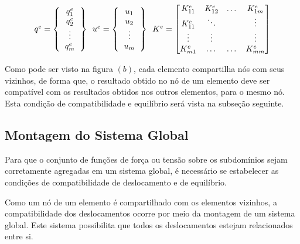 \documentclass[
    12pt,               %
    openright,          %
    oneside,
    a4paper,            %
    english,            %
    french,             %
    spanish,            %
    brazil              %
    ]{abntex2}
\begin{document}
  \begin{equation}
     \label{eq:assembly}
     \begin{tabular}{c c c}
     $q^e = 
         \left \{
         \begin{tabular}{c}
             $q^e_1$ \\
             $q^e_2$ \\
             \vdots \\
             $q^e_m$
         \end{tabular}       
         \right \}$
         \
     $u^e = 
         \left \{
         \begin{tabular}{c}
             $u_1$ \\
             $u_2$ \\
             \vdots \\
             $u_m$
         \end{tabular}       
         \right \}   $
         \
         $K^e =
         \begin{bmatrix}
             K^e_{11}    & K^e_{12}  & \dots     & K^e_{1m} \\
             K^e_{11}    & \ddots  & \   & \vdots \\
             \vdots  & \vdots     & \    & \vdots \\
             K^e_{m1}    & \dots   & \dots   & K^e_{mm} 
         \end{bmatrix}    $      
     \end{tabular} 
  \end{equation}
  
  
Como pode ser visto na figura \label{fig:malhaGenerica}$(b)$, cada elemento compartilha nós com seus vizinhos, de forma que, o resultado obtido no nó de um elemento deve ser compatível com os resultados obtidos nos outros elementos, para o mesmo nó. Esta condição de compatibilidade e equilíbrio será vista na subseção seguinte.
 
 \subsection{Montagem do Sistema Global}
 
 Para que o conjunto de funções de força ou tensão sobre os subdomínios sejam corretamente agregadas em um sistema global, é necessário se estabelecer as condições de compatibilidade de deslocamento e de equilíbrio.
 
 Como um nó de um elemento é compartilhado com os elementos vizinhos, a compatibilidade dos deslocamentos ocorre por meio da montagem de um sistema global. Este sistema possibilita que todos os deslocamentos estejam relacionados entre si.
 
\end{document}
